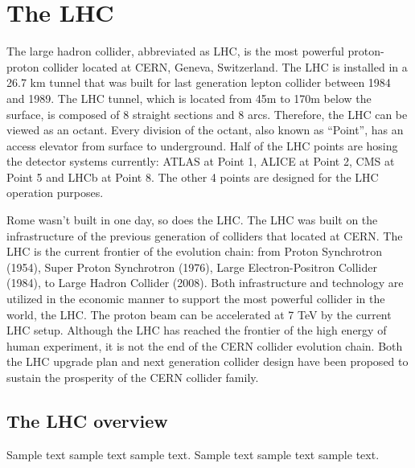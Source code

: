 \chapter{The LHC}
\label{ch:lhc}
\par The large hadron collider, abbreviated as LHC, is the most powerful proton-proton collider located at CERN, Geneva, Switzerland. The LHC is installed in a 26.7 km tunnel that was built for last generation lepton collider between 1984 and 1989. The LHC tunnel, which is located from 45m to 170m below the surface, is composed of 8 straight sections and 8 arcs. Therefore, the LHC can be viewed as an octant. Every division of the octant, also known as “Point”, has an access elevator from surface to underground. Half of the LHC points are hosing the detector systems currently: ATLAS\cite{Aad:2008zzm} at Point 1, ALICE\cite{Aamodt:2008zz} at Point 2, CMS\cite{Chatrchyan:2008aa} at Point 5 and LHCb\cite{Alves:2008zz} at Point 8. The other 4 points are designed for the LHC operation purposes.

\par Rome wasn’t built in one day, so does the LHC. The LHC was built on the infrastructure of the previous generation of colliders that located at CERN. The LHC is the current frontier of the evolution chain: from Proton Synchrotron (1954)\cite{Gilardoni:2011za}, Super Proton Synchrotron (1976)\cite{Doble:2017syb}, Large Electron-Positron Collider (1984)\cite{LepInjectorStudy:1983aa}\cite{LepInjectorStudy:1983ab}, to Large Hadron Collider (2008)\cite{Bruning:2004ej}\cite{Buning:2004wk}. Both infrastructure and technology are utilized in the economic manner to support the most powerful collider in the world, the LHC. The proton beam can be accelerated at 7 TeV by the current LHC setup. Although the LHC has reached the frontier of the high energy of human experiment, it is not the end of the CERN collider evolution chain. Both the LHC upgrade plan\cite{ApollinariG.:2017ojx} and next generation collider design\cite{Benedikt:2018csr} have been proposed to sustain the prosperity of the CERN collider family.

\section{The LHC overview}
\label{sec:lhcs1}

\par Sample text sample text sample text. Sample text sample text sample text.

